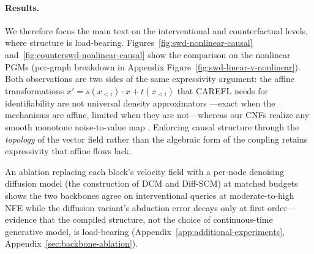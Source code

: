 \paragraph{Results.}  We therefore focus the main text on the interventional and counterfactual levels, where structure is load-bearing. Figures~\ref{fig:swd-nonlinear-causal} and~\ref{fig:counterswd-nonlinear-causal} show the comparison on the nonlinear PGMs (per-graph breakdown in Appendix Figure~\ref{fig:swd-linear-v-nonlinear}).  Both observations are two sides of the same expressivity argument: the affine transformations $x' = s(x_{<i}) \cdot x + t(x_{<i})$ that CAREFL needs for identifiability are not universal density approximators \citep[App.~B--C]{khemakhem2021causal}---exact when the mechanisms are affine, limited when they are not---whereas our CNFs realize any smooth monotone noise-to-value map \citep{zhang2020approximationcapabilitiesneuralodes}. Enforcing causal structure through the \emph{topology} of the vector field rather than the algebraic form of the coupling retains expressivity that affine flows lack.

An ablation replacing each block's velocity field with a per-node denoising diffusion model (the construction of DCM and Diff-SCM) at matched budgets shows the two backbones agree on interventional queries at moderate-to-high NFE while the diffusion variant's abduction error decays only at first order---evidence that the compiled structure, not the choice of continuous-time generative model, is load-bearing (Appendix~\ref{app:additional-experiments}, Appendix~\ref{sec:backbone-ablation}).

